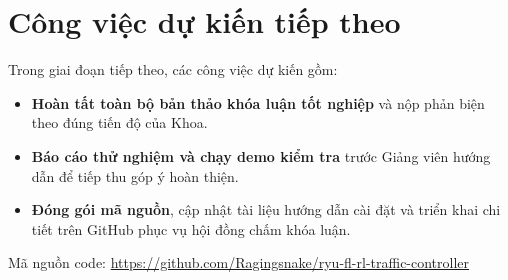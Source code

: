 \documentclass[11pt,a4paper]{article}
\begin{document}
\section{Công việc dự kiến tiếp theo}

Trong giai đoạn tiếp theo, các công việc dự kiến gồm:
\begin{itemize}[leftmargin=1.5em, itemsep=0.3ex]
    \item \textbf{Hoàn tất toàn bộ bản thảo khóa luận tốt nghiệp} và nộp phản biện theo đúng tiến độ của Khoa.
    \item \textbf{Báo cáo thử nghiệm và chạy demo kiểm tra} trước Giảng viên hướng dẫn để tiếp thu góp ý hoàn thiện.
    \item \textbf{Đóng gói mã nguồn}, cập nhật tài liệu hướng dẫn cài đặt và triển khai chi tiết trên GitHub phục vụ hội đồng chấm khóa luận.
\end{itemize}

\vspace{0.4cm}
Mã nguồn code: \url{https://github.com/Ragingsnake/ryu-fl-rl-traffic-controller}
\end{document}
